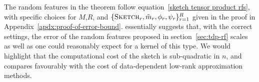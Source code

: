 \begin{theorem} \label{error bound theorem}
\end{theorem}
The random features in the theorem follow equation~\ref{sketch tensor product rfs},
with specific choices for $M$,$R$, and $\{\textsc{Sketch}_r,\tilde{m}_r,\phi_r,\psi_r\}_{r=1}^R$
given in the proof in Appendix~\ref{apdx:proof-of-error-bound}.
 essentially suggests that, with the correct settings,
the error of the random features proposed in section~\ref{sec:tdp-rf}
scales as well as one could reasonably expect for a kernel of this type.
We would highlight that the computational cost of the sketch is sub-quadratic in $n$, and compares favourably with the cost of data-dependent low-rank approximation methods.

